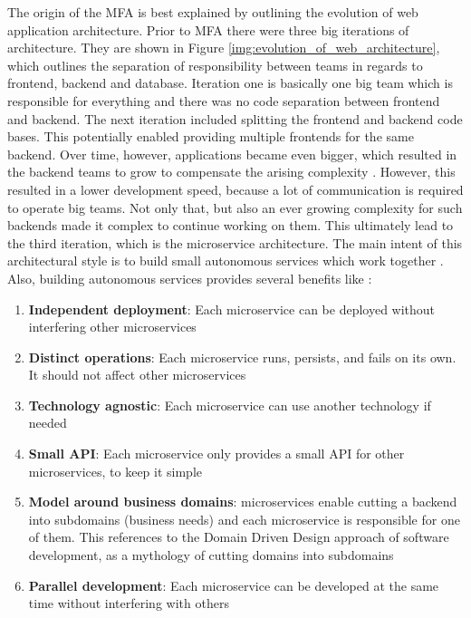 The origin of the \ac{MFA} is best explained by outlining the evolution of web application architecture.
Prior to \ac{MFA} there were three big iterations of architecture.
They are shown in Figure \ref{img:evolution_of_web_architecture}, which outlines the separation of responsibility between teams in regards to frontend, backend and database.
Iteration one is basically one big team which is responsible for everything and there was no code separation between frontend and backend.
The next iteration included splitting the frontend and backend code bases.
This potentially enabled providing multiple frontends for the same backend.
Over time, however, applications became even bigger, which resulted in the backend teams to grow to compensate the arising complexity \cite[p.~17f.]{Wenzel.2020}.
However, this resulted in a lower development speed, because a lot of communication is required to operate big teams.
Not only that, but also an ever growing complexity for such backends made it complex to continue working on them.
This ultimately lead to the third iteration, which is the microservice architecture.
The main intent of this architectural style is to build small autonomous services which work together \cite[p.~2]{Newman.2016}.
Also, building autonomous services provides several benefits like \cite{Leitner.2020}:

\pagebreak

\begin{enumerate}
    \item \textbf{Independent deployment}: Each microservice can be deployed without interfering other microservices
    \item \textbf{Distinct operations}: Each microservice runs, persists, and fails on its own. It should not affect other microservices
    \item \textbf{Technology agnostic}: Each microservice can use another technology if needed
    \item \textbf{Small API}: Each microservice only provides a small \ac{API} for other microservices, to keep it simple
    \item \textbf{Model around business domains}: microservices enable cutting a backend into subdomains (business needs) and each microservice is responsible for one of them. This references to the Domain Driven Design approach of software development, as a mythology of cutting domains into subdomains \cite{Evans.2004}
    \item \textbf{Parallel development}: Each microservice can be developed at the same time without interfering with others
\end{enumerate}


